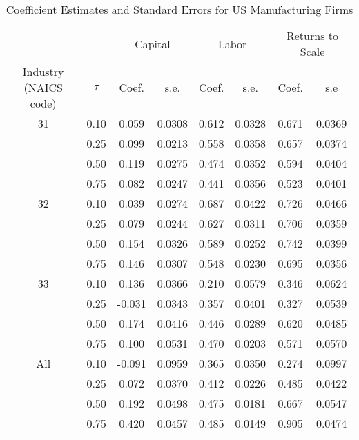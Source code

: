 \begin{table}[ht]
\centering
\caption{Coefficient Estimates and Standard Errors for US Manufacturing Firms} 
\begin{tabular}{cccccccc}
  \hline\hline & & \multicolumn{2}{c}{Capital}  & \multicolumn{2}{c}{Labor} & \multicolumn{2}{c}{Returns to Scale} \\ \cmidrule(lr){3-4} \cmidrule(lr){5-6} \cmidrule(lr){7-8}Industry (NAICS code) & $\tau$ & Coef. & s.e. & Coef. & s.e. & Coef. & s.e \\ 
  \hline
31 & 0.10 & 0.059 & 0.0308 & 0.612 & 0.0328 & 0.671 & 0.0369 \\ 
   & 0.25 & 0.099 & 0.0213 & 0.558 & 0.0358 & 0.657 & 0.0374 \\ 
   & 0.50 & 0.119 & 0.0275 & 0.474 & 0.0352 & 0.594 & 0.0404 \\ 
   & 0.75 & 0.082 & 0.0247 & 0.441 & 0.0356 & 0.523 & 0.0401 \\ 
  32 & 0.10 & 0.039 & 0.0274 & 0.687 & 0.0422 & 0.726 & 0.0466 \\ 
   & 0.25 & 0.079 & 0.0244 & 0.627 & 0.0311 & 0.706 & 0.0359 \\ 
   & 0.50 & 0.154 & 0.0326 & 0.589 & 0.0252 & 0.742 & 0.0399 \\ 
   & 0.75 & 0.146 & 0.0307 & 0.548 & 0.0230 & 0.695 & 0.0356 \\ 
  33 & 0.10 & 0.136 & 0.0366 & 0.210 & 0.0579 & 0.346 & 0.0624 \\ 
   & 0.25 & -0.031 & 0.0343 & 0.357 & 0.0401 & 0.327 & 0.0539 \\ 
   & 0.50 & 0.174 & 0.0416 & 0.446 & 0.0289 & 0.620 & 0.0485 \\ 
   & 0.75 & 0.100 & 0.0531 & 0.470 & 0.0203 & 0.571 & 0.0570 \\ 
  All & 0.10 & -0.091 & 0.0959 & 0.365 & 0.0350 & 0.274 & 0.0997 \\ 
   & 0.25 & 0.072 & 0.0370 & 0.412 & 0.0226 & 0.485 & 0.0422 \\ 
   & 0.50 & 0.192 & 0.0498 & 0.475 & 0.0181 & 0.667 & 0.0547 \\ 
   & 0.75 & 0.420 & 0.0457 & 0.485 & 0.0149 & 0.905 & 0.0474 \\ 
   \hline
\end{tabular}
\end{table}
